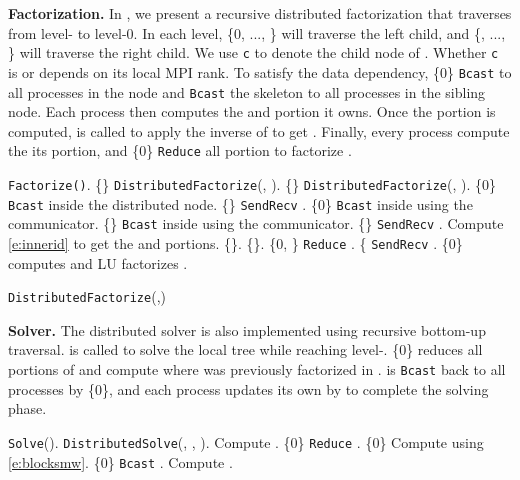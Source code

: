{\bf Factorization.}
In , we present a recursive distributed 
factorization that traverses from level- to level-0.
In each level, \{0, ..., \} will traverse the left child,
and \{, ..., \} will traverse the right child. 
We use \texttt{c} to denote the child node of .
Whether \texttt{c} is  or  depends on its local MPI rank.
To satisfy the data dependency, \{0\} \texttt{Bcast} 
 to all processes in the node
and \texttt{Bcast} the skeleton  to all processes
in the sibling node.
Each process then computes the  and  portion it owns.
Once the  portion is computed,  is called
to apply the inverse of  to get .
Finally, every process compute the its  portion, and 
\{0\} \texttt{Reduce} all  portion to factorize .






\begin{algorithm}[!htp]
\begin{algorithmic}
    \STATE \texttt{Factorize()}.
  \ELSE
    \STATE \{\} \texttt{DistributedFactorize}(, ).
    \STATE \{\} \texttt{DistributedFactorize}(, ).
    \STATE \{0\} \texttt{Bcast}  inside the distributed node.
    \STATE \{\} \texttt{SendRecv} .
    \STATE \{0\} \texttt{Bcast} inside  using the  communicator.
    \STATE \{\} \texttt{Bcast} inside  using the  communicator.
    \STATE \{\} \texttt{SendRecv} .
    \STATE Compute \eqref{e:innerid} to get the  and  portions.
    \STATE \{\}.
    \STATE \{\}.
    \STATE \{0, \} \texttt{Reduce} .
    \STATE \{ \texttt{SendRecv} .
    \STATE \{0\} computes and LU factorizes .
  \ENDIF
\end{algorithmic}
\caption{{} \texttt{DistributedFactorize}(,)}
\label{a:distributedfactor}
\end{algorithm}


{\bf Solver.}
The distributed solver is also implemented using recursive bottom-up
traversal.  is called to solve the local tree while 
reaching level-.
\{0\} reduces all portions of  and compute 
where  was previously factorized in .
 is \texttt{Bcast} back to all processes by \{0\}, 
and each process updates its own 
by  to complete the solving phase.


\begin{algorithm}[!htp]
\begin{algorithmic}
    \STATE \texttt{Solve}(). \ELSE
    \STATE \texttt{DistributedSolve}(, , ). \STATE Compute . \STATE \{0\} \texttt{Reduce} . \STATE \{0\}  Compute  using \eqref{e:blocksmw}. \STATE \{0\} \texttt{Bcast} . \STATE Compute . \ENDIF
\end{algorithmic}
\caption{{} }
\label{a:distributedsolve}
\end{algorithm}

